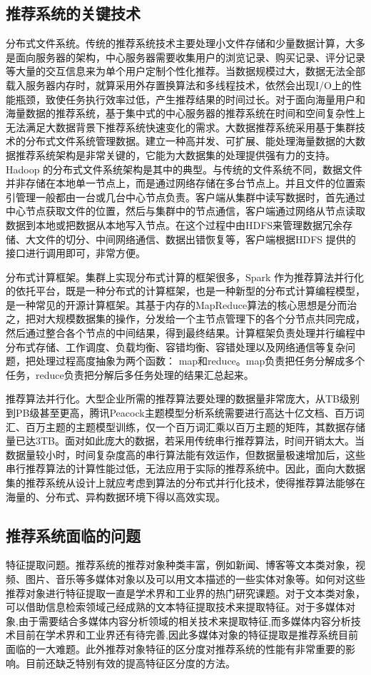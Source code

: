 	\subsection{推荐系统的关键技术}
	分布式文件系统。传统的推荐系统技术主要处理小文件存储和少量数据计算，大多是面向服务器的架构，中心服务器需要收集用户的浏览记录、购买记录、评分记录等大量的交互信息来为单个用户定制个性化推荐。当数据规模过大，数据无法全部载入服务器内存时，就算采用外存置换算法和多线程技术，依然会出现I/O上的性能瓶颈，致使任务执行效率过低，产生推荐结果的时间过长。对于面向海量用户和海量数据的推荐系统，基于集中式的中心服务器的推荐系统在时间和空间复杂性上无法满足大数据背景下推荐系统快速变化的需求。大数据推荐系统采用基于集群技术的分布式文件系统管理数据。建立一种高并发、可扩展、能处理海量数据的大数据推荐系统架构是非常关键的，它能为大数据集的处理提供强有力的支持。Hadoop 的分布式文件系统架构是其中的典型。与传统的文件系统不同，数据文件并非存储在本地单一节点上，而是通过网络存储在多台节点上。并且文件的位置索引管理一般都由一台或几台中心节点负责。客户端从集群中读写数据时，首先通过中心节点获取文件的位置，然后与集群中的节点通信，客户端通过网络从节点读取数据到本地或把数据从本地写入节点。在这个过程中由HDFS来管理数据冗余存储、大文件的切分、中间网络通信、数据出错恢复等，客户端根据HDFS 提供的接口进行调用即可，非常方便。
	
	分布式计算框架。集群上实现分布式计算的框架很多，Spark 作为推荐算法并行化的依托平台，既是一种分布式的计算框架，也是一种新型的分布式计算编程模型，是一种常见的开源计算框架。其基于内存的MapReduce算法的核心思想是分而治之，把对大规模数据集的操作，分发给一个主节点管理下的各个分节点共同完成，然后通过整合各个节点的中间结果，得到最终结果。计算框架负责处理并行编程中分布式存储、工作调度、负载均衡、容错均衡、容错处理以及网络通信等复杂问题，把处理过程高度抽象为两个函数： map和reduce。map负责把任务分解成多个任务，reduce负责把分解后多任务处理的结果汇总起来。
	
	推荐算法并行化。大型企业所需的推荐算法要处理的数据量非常庞大，从TB级别到PB级甚至更高，腾讯Peacock主题模型分析系统需要进行高达十亿文档、百万词汇、百万主题的主题模型训练，仅一个百万词汇乘以百万主题的矩阵，其数据存储量已达3TB。面对如此庞大的数据，若采用传统串行推荐算法，时间开销太大。当数据量较小时，时间复杂度高的串行算法能有效运作，但数据量极速增加后，这些串行推荐算法的计算性能过低，无法应用于实际的推荐系统中。因此，面向大数据集的推荐系统从设计上就应考虑到算法的分布式并行化技术，使得推荐算法能够在海量的、分布式、异构数据环境下得以高效实现。

	\subsection{推荐系统面临的问题}
	特征提取问题。推荐系统的推荐对象种类丰富，例如新闻、博客等文本类对象，视频、图片、音乐等多媒体对象以及可以用文本描述的一些实体对象等。如何对这些推荐对象进行特征提取一直是学术界和工业界的热门研究课题。对于文本类对象，可以借助信息检索领域己经成熟的文本特征提取技术来提取特征。对于多媒体对象,由于需要结合多媒体内容分析领域的相关技术来提取特征,而多媒体内容分析技术目前在学术界和工业界还有待完善,因此多媒体对象的特征提取是推荐系统目前面临的一大难题。此外推荐对象特征的区分度对推荐系统的性能有非常重要的影响。目前还缺乏特别有效的提高特征区分度的方法。

